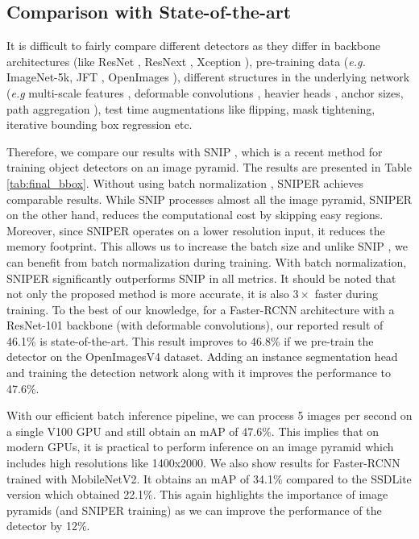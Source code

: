\documentclass{article}
\begin{document}
\subsection{Comparison with State-of-the-art}
It is difficult to fairly compare different detectors as they differ in backbone architectures (like ResNet \cite{he2016deep}, ResNext \cite{xie2017aggregated}, Xception \cite{chollet2016xception}), pre-training data (\textit{e.g.} ImageNet-5k, JFT \cite{hinton2015distilling}, OpenImages \cite{openimages}), different structures in the underlying network (\textit{e.g} multi-scale features \cite{lin2017feature,najibi2017ssh}, deformable convolutions \cite{dai2017deformable}, heavier heads \cite{peng2017megdet}, anchor sizes, path aggregation \cite{liu2018path}), test time augmentations like flipping, mask tightening, iterative bounding box regression etc. 

Therefore, we compare our results with SNIP \cite{singh2017analysis}, which is a recent method for training object detectors on an image pyramid. The results are presented in Table \ref{tab:final_bbox}. Without using batch normalization \cite{ioffe2015batch}, SNIPER achieves comparable results. While SNIP \cite{singh2017analysis} processes almost all the image pyramid, SNIPER on the other hand, reduces the computational cost by skipping easy regions. Moreover, since SNIPER operates on a lower resolution input, it reduces the memory footprint. This allows us to increase the batch size and unlike SNIP \cite{singh2017analysis}, we can benefit from batch normalization during training. With batch normalization, SNIPER significantly outperforms SNIP in all metrics. It should be noted that not only the proposed method is more accurate, it is also $3\times$ faster during training. To the best of our knowledge, for a Faster-RCNN architecture with a ResNet-101 backbone (with deformable convolutions), our reported result of 46.1\% is state-of-the-art. This result improves to 46.8\% if we pre-train the detector on the OpenImagesV4 dataset. Adding an instance segmentation head and training the detection network along with it improves the performance to 47.6\%.


With our efficient batch inference pipeline, we can process 5 images per second on a single V100 GPU and still obtain an mAP of 47.6\%. This implies that on modern GPUs, it is practical to perform inference on an image pyramid which includes high resolutions like 1400x2000. We also show results for Faster-RCNN trained with MobileNetV2. It obtains an mAP of 34.1\% compared to the SSDLite \cite{mobilenetv2} version which obtained 22.1\%. This again highlights the importance of image pyramids (and SNIPER training) as we can improve the performance of the detector by 12\%. 
\end{document}
